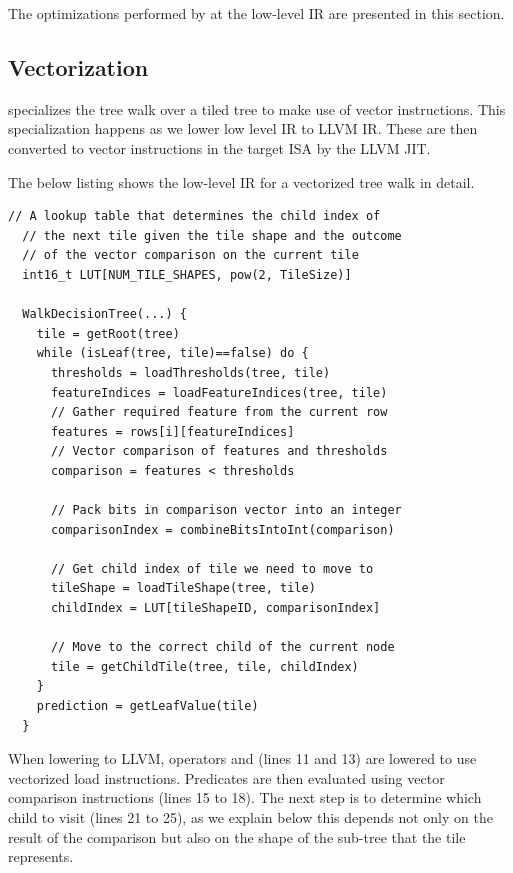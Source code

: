 The optimizations performed by \Treebeard{} at the low-level IR are presented in this section.

\subsection{Vectorization}
\label{sec:Vectorization}
\Treebeard{} specializes the tree walk over a tiled tree to make use of vector instructions. 
This specialization happens as we lower low level IR to LLVM IR.  These are then converted to vector instructions in the target ISA by 
the LLVM JIT.

The below listing shows the low-level IR for a vectorized tree walk in detail. 
\begin{lstlisting}[style=c++]
  // A lookup table that determines the child index of
  // the next tile given the tile shape and the outcome
  // of the vector comparison on the current tile
  int16_t LUT[NUM_TILE_SHAPES, pow(2, TileSize)]
  
  WalkDecisionTree(...) {
    tile = getRoot(tree)
    while (isLeaf(tree, tile)==false) do {
      thresholds = loadThresholds(tree, tile)
      featureIndices = loadFeatureIndices(tree, tile)
      // Gather required feature from the current row
      features = rows[i][featureIndices]
      // Vector comparison of features and thresholds
      comparison = features < thresholds
      
      // Pack bits in comparison vector into an integer
      comparisonIndex = combineBitsIntoInt(comparison)
      
      // Get child index of tile we need to move to
      tileShape = loadTileShape(tree, tile)
      childIndex = LUT[tileShapeID, comparisonIndex]
      
      // Move to the correct child of the current node
      tile = getChildTile(tree, tile, childIndex) 
    }
    prediction = getLeafValue(tile)
  }  
\end{lstlisting}

When lowering to LLVM, operators  and  (lines 11 and 13) are lowered to use vectorized load instructions. Predicates are then evaluated using vector comparison instructions (lines 15 to 18). 
The next step is to determine which child to visit (lines 21 to 25), as we explain below this depends not only on the result of the comparison but also on the shape of the sub-tree that the tile represents.

